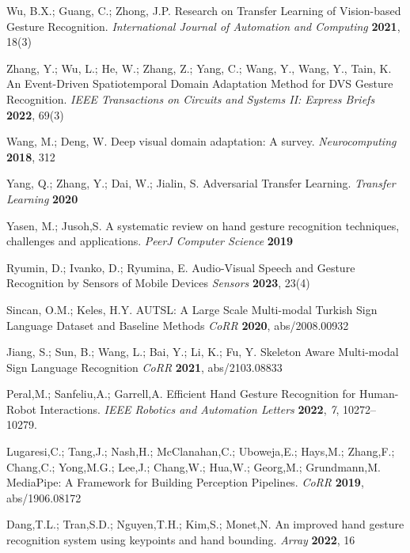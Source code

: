 \begin{thebibliography}{999}
Wu, B.X.; Guang, C.; Zhong, J.P.  Research on Transfer Learning of Vision-based Gesture Recognition. {\em International Journal of Automation and Computing} {\bf 2021}, {18(3)}

Zhang, Y.; Wu, L.; He, W.; Zhang, Z.; Yang, C.; Wang, Y., Wang, Y., Tain, K.  An Event-Driven Spatiotemporal Domain Adaptation Method for DVS Gesture Recognition. {\em IEEE Transactions on Circuits and Systems II: Express Briefs} {\bf 2022}, {69(3)}

Wang, M.; Deng, W.  Deep visual domain adaptation: A survey. {\em Neurocomputing} {\bf 2018}, {312}

Yang, Q.; Zhang, Y.; Dai, W.; Jialin, S.  Adversarial Transfer Learning. {\em Transfer Learning} {\bf 2020}

Yasen, M.; Jusoh,S. A systematic review on hand gesture recognition techniques, challenges and applications. {\em PeerJ Computer Science} {\bf 2019}

Ryumin, D.; Ivanko, D.; Ryumina, E. Audio-Visual Speech and Gesture Recognition by Sensors of Mobile Devices {\em Sensors} {\bf 2023}, {23(4)}

Sincan, O.M.; Keles, H.Y. AUTSL: A Large Scale Multi-modal Turkish Sign Language Dataset and Baseline Methods {\em CoRR} {\bf 2020}, {abs/2008.00932}

Jiang, S.; Sun, B.; Wang, L.; Bai, Y.; Li, K.; Fu, Y. Skeleton Aware Multi-modal Sign Language Recognition {\em CoRR} {\bf 2021}, {abs/2103.08833}

Peral,M.;  Sanfeliu,A.;  Garrell,A. Efficient Hand Gesture Recognition for Human-Robot Interactions. {\em IEEE Robotics and Automation Letters} {\bf 2022}, {\em 7}, 10272--10279.

Lugaresi,C.;  Tang,J.;  Nash,H.;  McClanahan,C.;  Uboweja,E.;  Hays,M.;  Zhang,F.;  Chang,C.;  Yong,M.G.;  Lee,J.;  Chang,W.;  Hua,W.;  Georg,M.;  Grundmann,M. MediaPipe: A Framework for Building Perception Pipelines. {\em CoRR} {\bf 2019}, {abs/1906.08172}

Dang,T.L.; Tran,S.D.; Nguyen,T.H.; Kim,S.; Monet,N. An improved hand gesture recognition system using keypoints and hand bounding. {\em Array} {\bf 2022}, {16}


\end{thebibliography}
